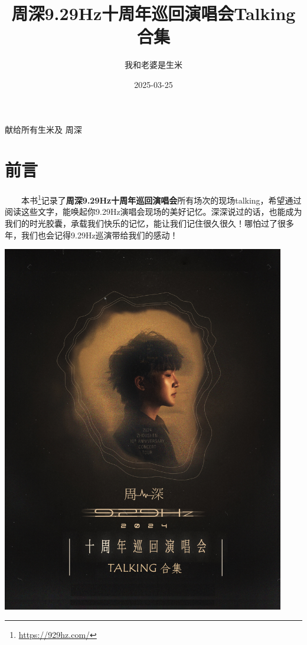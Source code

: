 \documentclass[]{ctexbook}
\title{周深9.29Hz十周年巡回演唱会Talking合集}
\author{我和老婆是生米}
\date{2025-03-25}
\renewcommand{\href}[2]{#2\footnote{\url{#1}}}
\begin{document}
\maketitle


\thispagestyle{empty}

\begin{center}
献给所有生米及
          周深
\end{center}

\setlength{\abovedisplayskip}{-5pt}
\setlength{\abovedisplayshortskip}{-5pt}

\mainmatter

{
\setcounter{tocdepth}{2}
\tableofcontents
}
\listoftables
\listoffigures
\chapter*{前言}\label{ux524dux8a00}


  \href{https://929hz.com/}{本书}记录了\textbf{周深9.29Hz十周年巡回演唱会}所有场次的现场talking，希望通过阅读这些文字，能唤起你9.29Hz演唱会现场的美好记忆。深深说过的话，也能成为我们的时光胶囊，承载我们快乐的记忆，能让我们记住很久很久！哪怕过了很多年，我们也会记得9.29Hz巡演带给我们的感动！

\begin{center}\includegraphics[width=350pt]{img/book-cover} \end{center}
\end{document}
